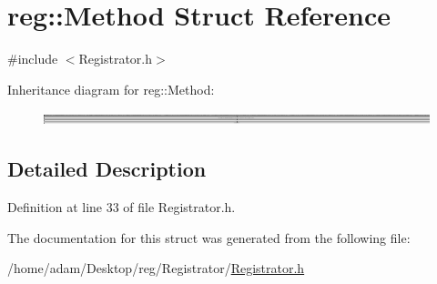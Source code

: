 \hypertarget{structreg_1_1_method}{}\section{reg\+:\+:Method Struct Reference}
\label{structreg_1_1_method}


{\ttfamily \#include $<$Registrator.\+h$>$}

Inheritance diagram for reg\+:\+:Method\+:\begin{figure}[H]
\begin{center}
\leavevmode
\includegraphics[height=0.347233cm]{structreg_1_1_method}
\end{center}
\end{figure}


\subsection{Detailed Description}


Definition at line 33 of file Registrator.\+h.



The documentation for this struct was generated from the following file\+:\begin{DoxyCompactItemize}
\item 
/home/adam/\+Desktop/reg/\+Registrator/\hyperlink{_registrator_8h}{Registrator.\+h}\end{DoxyCompactItemize}
